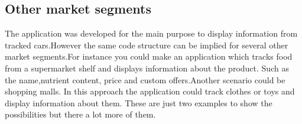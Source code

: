 \subsection{Other market segments}    
The application was developed for the main purpose to display information from tracked cars.However the same code structure can be implied for several other market segments.For instance you could make an application which tracks food from a supermarket shelf and displays information about the product. Such as the name,nutrient content, price and custom offers.Another scenario could be shopping malls. In this approach the application could track clothes or toys and display information about them. These are just two examples to show the possibilities but there a lot more of them.    
\newpage